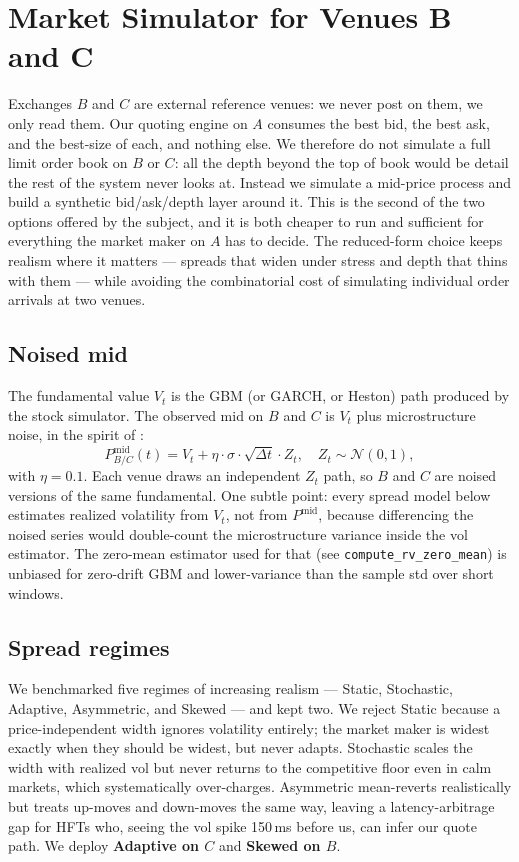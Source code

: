 \section{Market Simulator for Venues B and C}
\label{sec:market-simulator}

Exchanges $B$ and $C$ are external reference venues: we never post on
them, we only read them. Our quoting engine on $A$ consumes the best
bid, the best ask, and the best-size of each, and nothing else. We
therefore do not simulate a full limit order book on $B$ or $C$: all
the depth beyond the top of book would be detail the rest of the
system never looks at. Instead we simulate a mid-price process and
build a synthetic bid/ask/depth layer around it. This is the second of
the two options offered by the subject, and it is both cheaper to run
and sufficient for everything the market maker on $A$ has to decide.
The reduced-form choice keeps realism where it matters --- spreads
that widen under stress and depth that thins with them --- while
avoiding the combinatorial cost of simulating individual order
arrivals at two venues.

\subsection{Noised mid}
\label{sec:ms-mid}

The fundamental value $V_t$ is the GBM (or GARCH, or Heston) path
produced by the stock simulator. The observed mid on $B$ and $C$ is
$V_t$ plus microstructure noise, in the spirit of \citet{roll1984simple}:
\[
  P^{\mathrm{mid}}_{B/C}(t) = V_t + \eta \cdot \sigma \cdot \sqrt{\Delta t}\cdot Z_t,
  \quad Z_t \sim \mathcal{N}(0,1),
\]
with $\eta = 0.1$. Each venue draws an independent $Z_t$ path, so $B$
and $C$ are noised versions of the same fundamental. One subtle
point: every spread model below estimates realized volatility from
$V_t$, not from $P^{\mathrm{mid}}$, because differencing the noised
series would double-count the microstructure variance inside the vol
estimator. The zero-mean estimator used for that (see
\texttt{compute\_rv\_zero\_mean}) is unbiased for zero-drift GBM and
lower-variance than the sample std over short windows.

\subsection{Spread regimes}
\label{sec:ms-spreads}

We benchmarked five regimes of increasing realism --- Static,
Stochastic, Adaptive, Asymmetric, and Skewed --- and kept two. We
reject Static because a price-independent width ignores volatility
entirely; the market maker is widest exactly when they should be
widest, but never adapts. Stochastic scales the width with realized
vol but never returns to the competitive floor even in calm markets,
which systematically over-charges. Asymmetric mean-reverts
realistically but treats up-moves and down-moves the same way, leaving
a latency-arbitrage gap for HFTs who, seeing the vol spike 150\,ms
before us, can infer our quote path. We deploy \textbf{Adaptive on
$C$} and \textbf{Skewed on $B$}.

